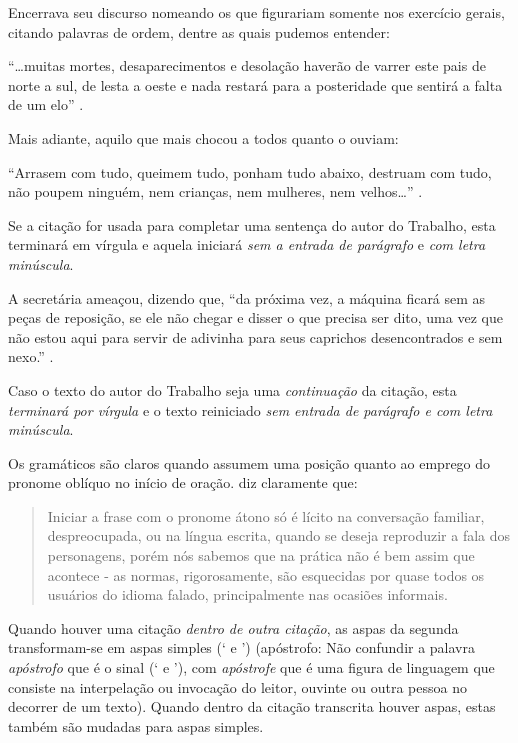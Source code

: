 Encerrava seu discurso nomeando os que figurariam somente nos exercício gerais, citando palavras de ordem, dentre as quais pudemos entender:

``\ldots muitas mortes, desaparecimentos e desolação haverão de varrer este pais de norte a sul, de lesta a oeste e nada restará para a posteridade que sentirá a falta de um elo'' \cite{morgado1967}.

Mais adiante, aquilo que mais chocou a todos quanto o ouviam:

``Arrasem com tudo, queimem tudo, ponham tudo abaixo, destruam com tudo, não poupem ninguém, nem crianças, nem mulheres, nem velhos\ldots'' \cite{morgado1967}.

Se a citação for usada para completar uma sentença do autor do Trabalho, esta terminará em vírgula e aquela iniciará \emph{sem a entrada de parágrafo} e \emph{com letra minúscula}.

A secretária ameaçou, dizendo que, ``da próxima vez, a máquina ficará sem as peças de reposição, se ele não chegar e disser o que precisa ser dito, uma vez que não estou aqui para servir de adivinha para seus caprichos desencontrados e sem nexo.'' \cite[p. 34]{marques1982}.

Caso o texto do autor do Trabalho seja uma \emph{continuação} da citação, esta \emph{terminará por vírgula} e o texto reiniciado \emph{sem entrada de parágrafo e com letra minúscula}.

 Os gramáticos são claros quando assumem uma posição quanto ao emprego do pronome oblíquo no início de oração.  diz claramente que: \begin{quote}Iniciar a frase com o pronome átono só é lícito na conversação familiar, despreocupada, ou na língua escrita, quando se deseja reproduzir a fala dos personagens, porém nós sabemos que na prática não é bem assim que acontece - as normas, rigorosamente, são esquecidas por quase todos os usuários do idioma falado, principalmente nas ocasiões informais.\end{quote}

Quando houver uma citação \emph{dentro de outra citação}, as aspas da segunda transformam-se em aspas simples (` e ') (apóstrofo: Não confundir a palavra \emph{apóstrofo} que é o sinal (` e '), com \emph{apóstrofe} que é uma figura de linguagem que consiste na interpelação ou invocação do leitor, ouvinte ou outra pessoa no decorrer de um texto). Quando dentro da citação transcrita houver aspas, estas também são mudadas para aspas simples.

